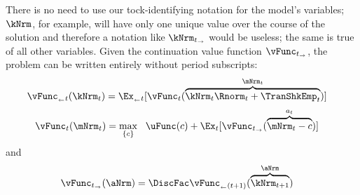 There is no need to use our {tock}-identifying notation for the model's variables; $\kNrm$, for example, will have only one unique value over the course of the solution and therefore a notation like $\kNrm_{t_\rightarrow}$ would be useless; the same is true of all other variables.  Given the continuation value function $\vFunc_{t_\rightarrow}$, the problem can be written entirely without {period} subscripts:
  \begin{equation}\begin{gathered}\begin{aligned}
        \vFunc_{_\leftarrow t}(\kNrm_{t}) & = \Ex_{_\leftarrow t}[\vFunc_{{t}}(\overbrace{\kNrm_{t} \Rnorm_{t} + \TranShkEmp_{t}}^{\mNrm_{t}})]  \label{eq:vBeg}
      \end{aligned}\end{gathered}\end{equation}
  \begin{equation}\begin{gathered}\begin{aligned}
        \vFunc_{{t}}(\mNrm_{t}) & = \max_{\{{c}\}}~~\uFunc({c}) +\Ex_{{t}}[ \vFunc_{t_\rightarrow}(\overbrace{\mNrm_{t}-{c}}^{a_{t}})] \label{eq:vMid}
      \end{aligned}\end{gathered}\end{equation}
and
  \begin{equation}\begin{gathered}\begin{aligned}
        \vFunc_{t_\rightarrow}(\aNrm) & = \DiscFac \vFunc_{_\leftarrow{(t+1)}}(\overbrace{\kNrm_{t+1}}^{\aNrm}) \label{eq:vEndtdefn}
      \end{aligned}\end{gathered}\end{equation}

